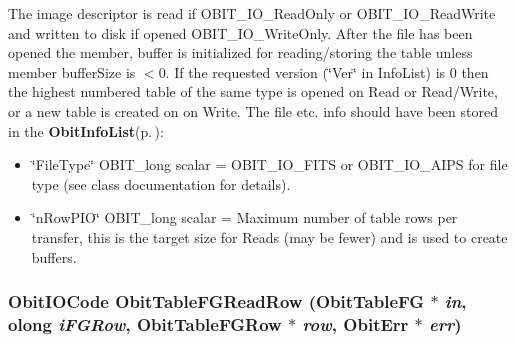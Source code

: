 The image descriptor is read if OBIT\_\-IO\_\-Read\-Only or OBIT\_\-IO\_\-Read\-Write and written to disk if opened OBIT\_\-IO\_\-Write\-Only. After the file has been opened the member, buffer is initialized for reading/storing the table unless member buffer\-Size is $<$0. If the requested version (\char`\"{}Ver\char`\"{} in Info\-List) is 0 then the highest numbered table of the same type is opened on Read or Read/Write, or a new table is created on on Write. The file etc. info should have been stored in the {\bf Obit\-Info\-List}{\rm (p.\,\pageref{structObitInfoList})}: \begin{itemize}
\item \char`\"{}File\-Type\char`\"{} OBIT\_\-long scalar = OBIT\_\-IO\_\-FITS or OBIT\_\-IO\_\-AIPS for file type (see class documentation for details). \item \char`\"{}n\-Row\-PIO\char`\"{} OBIT\_\-long scalar = Maximum number of table rows per transfer, this is the target size for Reads (may be fewer) and is used to create buffers. 
\end{itemize}
\subsubsection{\setlength{\rightskip}{0pt plus 5cm}Obit\-IOCode Obit\-Table\-FGRead\-Row ({\bf Obit\-Table\-FG} $\ast$ {\em in}, {\bf olong} {\em i\-FGRow}, {\bf Obit\-Table\-FGRow} $\ast$ {\em row}, {\bf Obit\-Err} $\ast$ {\em err})}\label{ObitTableFG_8c_a22}


